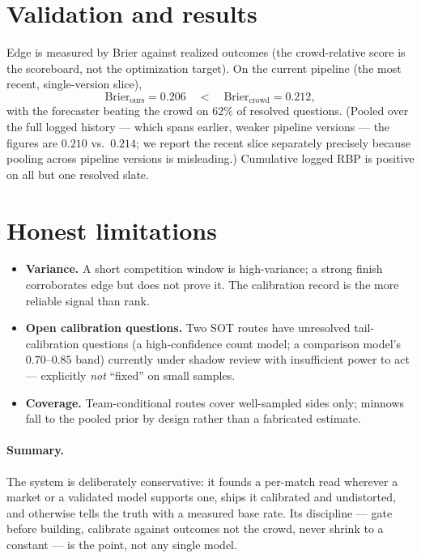 \documentclass[11pt]{article}
\begin{document}
\section{Validation and results}
Edge is measured by Brier against realized outcomes (the crowd-relative score is the scoreboard,
not the optimization target). On the current pipeline (the most recent, single-version slice),
\[
\text{Brier}_{\text{ours}} = 0.206 \quad<\quad \text{Brier}_{\text{crowd}} = 0.212,
\]
with the forecaster beating the crowd on $62\%$ of resolved questions. (Pooled over the full logged
history --- which spans earlier, weaker pipeline versions --- the figures are $0.210$ vs.\ $0.214$;
we report the recent slice separately precisely because pooling across pipeline versions is
misleading.) Cumulative logged RBP is positive on all but one resolved slate.

\section{Honest limitations}
\begin{itemize}
\item \textbf{Variance.} A short competition window is high-variance; a strong finish corroborates
edge but does not prove it. The calibration record is the more reliable signal than rank.
\item \textbf{Open calibration questions.} Two SOT routes have unresolved tail-calibration
questions (a high-confidence count model; a comparison model's $0.70$--$0.85$ band) currently under
shadow review with insufficient power to act --- explicitly \emph{not} ``fixed'' on small samples.
\item \textbf{Coverage.} Team-conditional routes cover well-sampled sides only; minnows fall to the
pooled prior by design rather than a fabricated estimate.
\end{itemize}

\paragraph{Summary.} The system is deliberately conservative: it founds a per-match read wherever a
market or a validated model supports one, ships it calibrated and undistorted, and otherwise tells
the truth with a measured base rate. Its discipline --- gate before building, calibrate against
outcomes not the crowd, never shrink to a constant --- is the point, not any single model.
\end{document}

